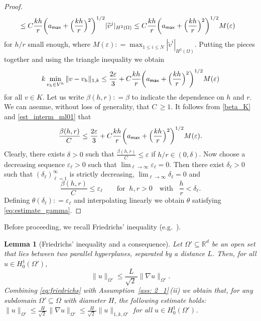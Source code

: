 \documentclass[numbers,webpdf,imaiai]{ima-authoring-template}%
\theoremstyle{thmstyletwo}%
\newtheorem{lemma}[theorem]{Lemma}
\numberwithin{equation}{section}
\newcommand{\assign}{\mathrel{\mathop:}=}
\numberwithin{equation}{section}
\newcommand{\amax}{a_{\textup{\textsf{max}}}}
\begin{document}
{\begin{proof}
\begin{align}
	&\le C\frac{kh}{r}\biggl(\amax+\Bigl(\frac{kh}{r}\Bigr)^2\biggr)^{1/2}|\widetilde{v}^j|_{H^2(\Omega)}
	\le	C\frac{kh}{r}\biggl(\amax+\Bigl(\frac{kh}{r}\Bigr)^2\biggr)^{1/2}M(\varepsilon)
\label{est_interm_ml01}
\end{align}
for $h/r$ small enough, where
\(
	M(\varepsilon) \assign \max_{1 \le i \le N} |\widetilde{v}^i|_{H^2(\Omega)}.
\)
Putting the pieces together and using the triangle inequality we obtain
\begin{equation*}
	k \min_{v_h \in V^h} \|v-v_h\|_{1,k}
	\le \frac{2\varepsilon}{3} + C\frac{kh}{r}\biggl(\amax+\Bigl(\frac{kh}{r}\Bigr)^2\biggr)^{1/2}M(\varepsilon)
\end{equation*}
for all $v \in K$.
Let us write $\beta(h,r)\assign\beta$ to indicate the dependence on $h$ and $r$.  
We can assume, without loss of generality, that $C \, \ge1$.
It follows from \eqref{beta_K} and \eqref{est_interm_ml01} that
\[
	\frac{\beta(h,r)}{C\,} \le \frac{2\varepsilon}{3} + C\frac{kh}{r}\biggl(\amax+\Bigl(\frac{kh}{r}\Bigr)^2\biggr)^{1/2}M(\varepsilon).
\]
Clearly, there exists $\delta>0$ such that $\frac{\beta(h,r)}{C\,}\le\varepsilon$ if $h/r\in(0,\delta)$.
Now choose a decreasing sequence $\varepsilon_\ell>0$ such that $\lim_{\ell\to\infty}\varepsilon_\ell=0$.
Then there exist $\delta_\ell>0$ such that $(\delta_\ell)_{\ell=1}^\infty$ is strictly decreasing, $\lim_{\ell\to\infty}\delta_\ell=0$ and
\[
	\frac{\beta(h,r)}{C\,} \le \varepsilon_\ell \qquad\text{for} \;\; h,r>0 \quad \text{with}\;\;\; \frac{h}{r}<\delta_\ell.
\]
Defining $\theta(\delta_\ell)\assign\varepsilon_\ell$ and interpolating linearly we obtain  $\theta$
satisfying  \eqref{eq:estimate_gamma}.
\end{proof}

\noindent
Before proceeding, we  recall  Friedrichs' inequality (e.g.\ \cite[Theorem 13.19]{Leoni:2017:FCS}).

\begin{lemma}[Friedrichs' inequality and a consequence]\label{lemma: 2.5}
Let $\Omega' \subseteq \mathbb{R}^d$ be an open set that lies between two parallel hyperplanes, separated by a distance $L$.  
Then, for all $u \in H^1_0(\Omega')$, 
\begin{equation}
\label{eq:friedrichs}
	\|u \|_{\Omega'} \le \frac{L}{\sqrt{2}\,} \|\nabla u\|_{\Omega'}. 
\end{equation}
Combining \eqref{eq:friedrichs} with Assumption~\ref{ass: 2_1}\,(ii) we obtain that, for any subdomain $\Omega' \subseteq \Omega$ with diameter $H$, 
the following estimate holds:
\(
	\|u\|_{\Omega'} \le \frac{H}{\sqrt{2}\,} \|\nabla u\|_{\Omega'} \le \frac{H}{\sqrt{2}\,} \|u\|_{1,k,\Omega'} 
\)
for all $u \in H^1_0(\Omega')$.
\end{lemma}

}
\end{document}
